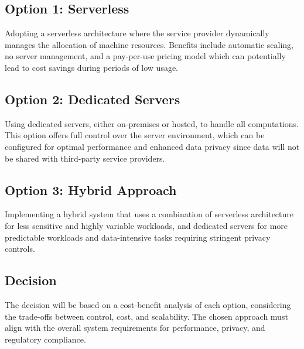\subsection*{Option 1: Serverless}
Adopting a serverless architecture where the service provider dynamically manages the allocation of machine resources. Benefits include automatic scaling, no server management, and a pay-per-use pricing model which can potentially lead to cost savings during periods of low usage.

\subsection*{Option 2: Dedicated Servers}
Using dedicated servers, either on-premises or hosted, to handle all computations. This option offers full control over the server environment, which can be configured for optimal performance and enhanced data privacy since data will not be shared with third-party service providers.

\subsection*{Option 3: Hybrid Approach}
Implementing a hybrid system that uses a combination of serverless architecture for less sensitive and highly variable workloads, and dedicated servers for more predictable workloads and data-intensive tasks requiring stringent privacy controls.

\subsection*{Decision}
The decision will be based on a cost-benefit analysis of each option, considering the trade-offs between control, cost, and scalability. The chosen approach must align with the overall system requirements for performance, privacy, and regulatory compliance.

